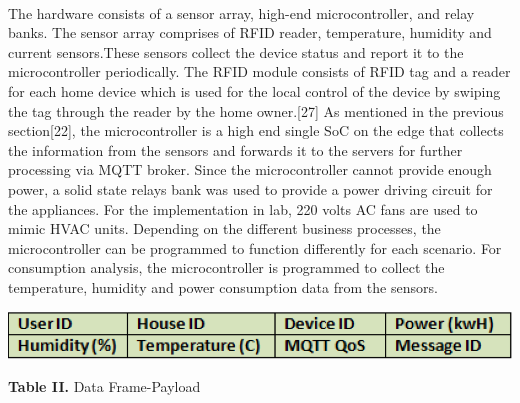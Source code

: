 \documentclass[a4paper,12pt,oneside]{article}
\let\counterwithin\relax
\begin{document}
\paragraph{}
The hardware consists of a sensor array, high-end
microcontroller, and relay banks. The sensor array comprises
of RFID reader, temperature, humidity and current sensors.These sensors collect the device status and report it to the
microcontroller periodically. The RFID module consists of
RFID tag and a reader for each home device which is used for
the local control of the device by swiping the tag through the
reader by the home owner.[27] As mentioned in the previous
section[22], the microcontroller is a high end single SoC on
the edge that collects the information from the sensors and
forwards it to the servers for further processing via MQTT
broker. Since the microcontroller cannot provide enough
power, a solid state relays bank was used to provide a power
driving circuit for the appliances. For the implementation in
lab, 220 volts AC fans are used to mimic HVAC units.
Depending on the different business processes, the
microcontroller can be programmed to function differently for
each scenario. For consumption analysis, the microcontroller
is programmed to collect the temperature, humidity and power
consumption data from the sensors.


\begin{table}[H]
\includegraphics[width=15cm]{Table2.png}
\centering
\caption[Data Frame-Payload]{\textbf{Table II.} Data Frame-Payload}
\end{table}
\end{document}
